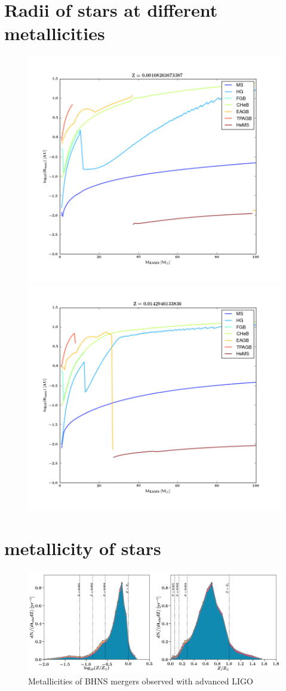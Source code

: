 \documentclass[twocolumn]{aastex63}
\newcommand\bhnsSingle{BHNS\xspace}
\begin{document}
\section{Radii of stars at different metallicities}
\label{sec:app-radii-as-function-of-Z}
%
\begin{figure}
		\includegraphics[width=.4\textwidth]{../OtherImages/12}
		\includegraphics[width=.4\textwidth]{../OtherImages/25}
    \caption{ } 
    \label{fig:Radii-vs-metallicity}
\end{figure}


\section{metallicity of stars}

\begin{figure}
\includegraphics[width=1\textwidth]{../PlottingScripts/7_Discussion/Metallicities_channels_BHNS.png}
   \caption{Metallicities of \bhnsSingle mergers observed with advanced LIGO   }
  \label{fig:BHNS_DCO_metallicities_observed_LIGO}
\end{figure}
%
\end{document}
